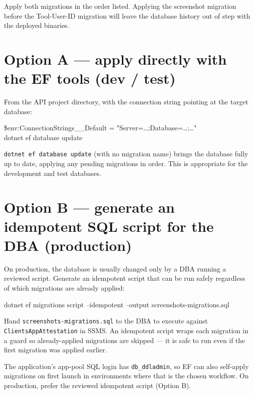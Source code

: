 \documentclass[12pt,a4paper]{report}
\begin{document}
\begin{warnbox}
Apply both migrations in the order listed. Applying the screenshot migration before the
Tool-User-ID migration will leave the database history out of step with the deployed binaries.
\end{warnbox}

\section{Option A --- apply directly with the EF tools (dev / test)}

From the API project directory, with the connection string pointing at the target database:

\begin{codebox}
\ttfamily\small
\$env:ConnectionStrings\_\_Default = "Server=\ldots;Database=\ldots;\ldots"\\
dotnet ef database update
\end{codebox}

\texttt{dotnet ef database update} (with no migration name) brings the database fully up to date,
applying any pending migrations in order. This is appropriate for the development and test databases.

\section{Option B --- generate an idempotent SQL script for the DBA (production)}

On production, the database is usually changed only by a DBA running a reviewed script. Generate an
idempotent script that can be run safely regardless of which migrations are already applied:

\begin{codebox}
\ttfamily\small
dotnet ef migrations script --idempotent --output screenshots-migrations.sql
\end{codebox}

Hand \texttt{screenshots-migrations.sql} to the DBA to execute against \texttt{ClientsAppAttestation}
in SSMS. An idempotent script wraps each migration in a guard so already-applied migrations are
skipped --- it is safe to run even if the first migration was applied earlier.

\begin{notebox}
The application's app-pool SQL login has \texttt{db\_ddladmin}, so EF can also self-apply migrations
on first launch in environments where that is the chosen workflow. On production, prefer the
reviewed idempotent script (Option B).
\end{notebox}
\end{document}
